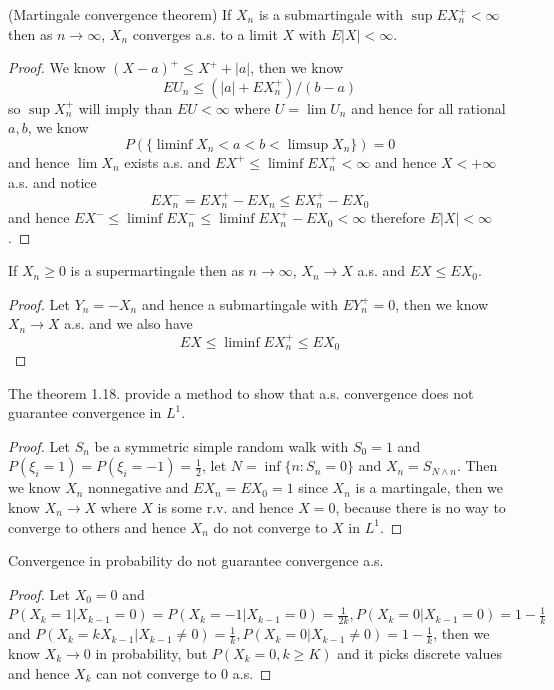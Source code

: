 \begin{theorem}
    (Martingale convergence theorem) If $X_n$ is a submartingale with $\sup EX_n^+ < \infty$ then as $n\to\infty$, $X_n$ converges a.s. to a limit $X$ with $E|X|<\infty$.
\end{theorem}
\begin{proof}\par
    We know $(X-a)^+ \leq X^+ +|a|$, then we know
    \[EU_n \leq (|a|+EX_n^+)/(b-a)\]
    so $\sup X_n^+$ will imply than $EU < \infty$ where $U = \lim U_n$ and hence for all rational $a,b$, we know
    \[P(\{\liminf X_n < a < b < \limsup X_n\}) = 0\]
    and hence $\lim X_n$ exists a.s. and $EX^+ \leq \liminf EX_n^+ <\infty$ and hence $X<+\infty$ a.s. and notice
    \[EX_n^- = EX_n^+ - EX_n \leq EX_n^+ - EX_0\]
    and hence $EX^- \leq \liminf EX_n^- \leq \liminf EX_n^+ - EX_0 < \infty$
    therefore $E|X|<\infty$. 
\end{proof}

\begin{theorem}
    If $X_n\geq 0$ is a supermartingale then as $n\to\infty$, $X_n\to X$ a.s. and $EX\leq EX_0$.
\end{theorem}
\begin{proof}\par
    Let $Y_n = -X_n$ and hence a submartingale with $EY_n^+ = 0$, then we know $X_n \to X$ a.s. and we also have
    \[EX \leq \liminf EX_n^+ \leq EX_0\] 
\end{proof}

\begin{proposition}
    The theorem 1.18. provide a method to show that a.s. convergence does not guarantee convergence in $L^1$.
\end{proposition}
\begin{proof}\par
Let $S_n$ be a symmetric simple random walk with $S_0 = 1$ and $P(\xi_i=1) = P(\xi_i = -1) = \tfrac{1}{2}$, let $N = \inf\{n: S_n = 0\}$ and $X_n = S_{N\wedge n}$. Then we know $X_n$ nonnegative and $EX_n = EX_0=1$ since $X_n$ is a martingale, then we know $X_n \to X$ where $X$ is some r.v. and hence $X = 0$, because there is no way to converge to others and hence $X_n$ do not converge to $X$ in $L^1$.
\end{proof}

\begin{proposition}
    Convergence in probability do not guarantee convergence a.s.
\end{proposition}
\begin{proof}\par
    Let $X_0 = 0$ and $P(X_k = 1|X_{k-1} = 0) = P(X_k = -1|X_{k-1} = 0) = \tfrac{1}{2k}, P(X_k = 0|X_{k-1} = 0) = 1-\tfrac{1}{k}$ and $P(X_k = kX_{k-1}|X_{k-1} \neq 0) = \tfrac{1}{k}, P(X_k = 0|X_{k-1} \neq 0) = 1-\tfrac{1}{k}$, then we know $X_k \to 0$ in probability, but $P(X_k = 0, k\geq K)$ and it picks discrete values and hence $X_k$ can not converge to $0$ a.s. 
\end{proof}

